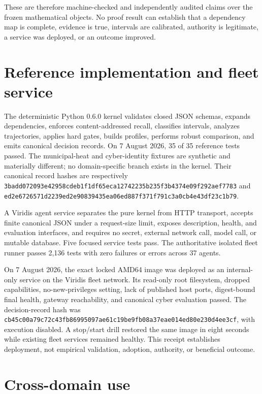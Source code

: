 \documentclass[10pt]{article}
\newcommand{\hashfour}[4]{\texttt{#1}\allowbreak\texttt{#2}\allowbreak\texttt{#3}\allowbreak\texttt{#4}}
\begin{document}
These are therefore machine-checked and independently audited claims over the
frozen mathematical objects. No proof result can establish that a dependency
map is complete, evidence is true, intervals are calibrated, authority is
legitimate, a service was deployed, or an outcome improved.

\section{Reference implementation and fleet service}

The deterministic Python 0.6.0 kernel validates closed JSON schemas, expands
dependencies, enforces content-addressed recall, classifies intervals, analyzes
trajectories, applies hard gates, builds profiles, performs robust comparison,
and emits canonical decision records. On 7 August 2026, 35 of 35 reference
tests passed. The municipal-heat and cyber-identity fixtures are synthetic and
materially different; no domain-specific branch exists in the kernel. Their
canonical record hashes are respectively
\hashfour{3badd072093e4295}{8cdeb1f1df65eca1}{2742235b235f3b43}{74e09f292aef7783}
and
\hashfour{ed2e6726571d2239}{ed2e90839435ea06}{ed887f371f791c3a}{0cb4e43df23c1b79}.

A Viridis agent service separates the pure kernel from HTTP transport, accepts
finite canonical JSON under a request-size limit, exposes description, health,
and evaluation interfaces, and requires no secret, external network call,
model call, or mutable database. Five focused service tests pass. The
authoritative isolated fleet runner passes 2,136 tests with zero failures or
errors across 37 agents.

On 7 August 2026, the exact locked AMD64 image was deployed as an internal-only
service on the Viridis fleet network. Its read-only root filesystem, dropped
capabilities, no-new-privileges setting, lack of published host ports,
digest-bound final health, gateway reachability, and canonical cyber evaluation
passed. The decision-record hash was
\hashfour{cb45c00a79c72c43}{fb86995097ae61c1}{9be9fb08a37eae01}{4ed80e230d4ee3cf},
with execution disabled. A stop/start drill restored the same image in eight
seconds while existing fleet services remained healthy. This receipt
establishes deployment, not empirical validation, adoption, authority, or
beneficial outcome.

\section{Cross-domain use}
\end{document}
